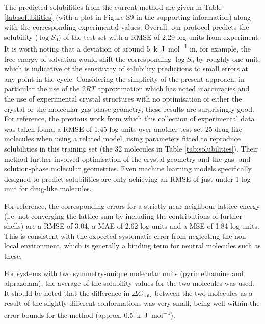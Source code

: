 \documentclass[twoside,twocolumn,9pt]{article}
\begin{document}
The predicted solubilities from the current method are given in Table \ref{tab:solubilities} (with a plot in Figure S9 in the supporting information) along with the corresponding experimental values. Overall, our protocol predicts the solubility ($\log{S_{0}}$)
of the test set with a RMSE of 2.29 log units from experiment. It is worth noting that a deviation of around \qty{5}{k.J.mol^{-1}} in, for example, the free energy of solvation would shift the corresponding $\log{S_{0}}$ by roughly one unit, which is indicative of 
the sensitivity of solubility predictions to small errors at any point in the cycle. Considering the simplicity of the present approach, in particular the use of the $2 RT$ approximation which has noted inaccuracies\cite{Fowles2021} and the use of experimental crystal structures with no optimisation of either the crystal or the molecular gas-phase geometry, these results are surprisingly good. For reference, the previous work\cite{Palmer2008} from which this collection of experimental data was taken found a RMSE of 1.45 log units over another test set 25 drug-like molecules when using a related model, using parameters fitted to reproduce solubilities in this training set (the 32 molecules in Table \ref{tab:solubilities}). Their method further involved optimisation of the crystal geometry and the gas- and solution-phase molecular geometries. Even machine learning models specifically designed to predict solubilities are only achieving an RMSE of just under 1 log unit for drug-like molecules.\cite{Mitchell2020}

For reference, the corresponding errors for a strictly near-neighbour lattice energy (i.e. not converging the lattice sum by including the contributions of further shells) are a RMSE of 3.04, a MAE of 2.62 log units and a MSE of 1.84 log units. This is consistent with the expected systematic error from neglecting the non-local environment, which is generally a binding term for neutral molecules such as these.

For systems with two symmetry-unique molecular units (pyrimethamine and alprazolam), the average of the solubility values for the two molecules was used. It should be noted that the difference in $\Delta G_{\text{solv}}$ between the two molecules as a result of the slightly different conformations was very small, being well within the error bounds for the method (approx. \qty{0.5}{k.J.mol^{-1}}).
\end{document}
